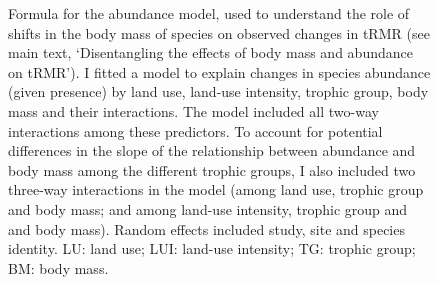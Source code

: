 \vspace{2cm}


\begin{figure}[h!]
\centering
{}

\caption[Formula for the abundance model, used to understand the role of shifts in the body mass of species on observed changes in tRMR]{Formula for the abundance model, used to understand the role of shifts in the body mass of species on observed changes in tRMR (see main text, `Disentangling the effects of body mass and abundance on tRMR'). I fitted a model to explain changes in species abundance (given presence) by land use, land-use intensity, trophic group, body mass and their interactions. The model included all two-way interactions among these predictors. To account for potential differences in the slope of the relationship between abundance and body mass among the different trophic groups, I also included two three-way interactions in the model (among land use, trophic group and body mass; and among land-use intensity, trophic group and and body mass). Random effects included study, site and species identity. LU: land use; LUI: land-use intensity; TG: trophic group; BM: body mass.}
\label{SI5_figure1}
\end{figure}


